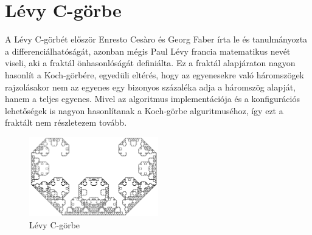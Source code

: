 \section*{Lévy C-görbe}
A Lévy C-görbét először Enresto Cesàro és Georg Faber írta le és tanulmányozta a differenciálhatóságát, azonban mégis Paul Lévy francia matematikus nevét viseli, aki a fraktál önhasonlóságát definiálta. \cite{levy-c-wiki} Ez a fraktál alapjáraton nagyon hasonlít a Koch-görbére, egyedüli eltérés, hogy az egyenesekre való háromszögek rajzolásakor nem az egyenes egy bizonyos százaléka adja a háromszög alapját, hanem a teljes egyenes. Mivel az algoritmus implementációja és a konfigurációs lehetőségek is nagyon hasonlítanak a Koch-görbe alguritmuséhoz, így ezt a fraktált nem részletezem tovább.
\begin{figure}[!ht]
	\begin{center}
		\includegraphics[width=0.5\textwidth]{img/LevyCCurve}
		\caption[labelInTOC]{Lévy C-görbe}
	\end{center}
\end{figure}

